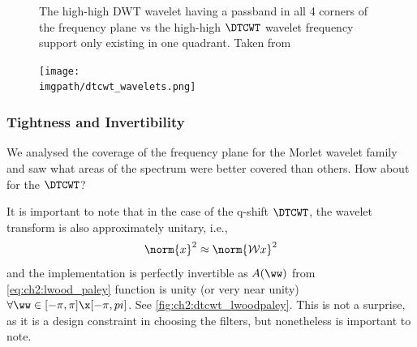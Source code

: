   \begin{figure}
      \newline
              { The high-high DWT wavelet having a passband in
              all 4 corners of the frequency plane vs  the
              high-high $\DTCWT$ wavelet frequency support only existing in one
              quadrant. Taken from \cite{selesnick_dual-tree_2005}}
      \label{fig:ch2:dwt_dtcwt_hh}
  \end{figure}
  \begin{figure}
    \centering
      \texttt{[image: \\imgpath/dtcwt\_wavelets.png]}
      \label{fig:ch2:dtcwt_wavelets}
  \end{figure}

\subsubsection{Tightness and Invertibility}
  We analysed the coverage of the frequency plane for the Morlet wavelet family
  and saw what areas of the spectrum were better covered than others. How about
  for the $\DTCWT$?

  It is important to note that in the case of the q-shift $\DTCWT$, the wavelet
  transform is also approximately unitary, i.e.,\
  \begin{equation}
    \norm{x}^2 \approx \norm{\mathcal{W}x}^2
  \end{equation}
  and the implementation is perfectly invertible as $A(\ww)$ from
  \eqref{eq:ch2:lwood_paley}
  function is unity (or very near unity) $\forall \ww \in [-\pi, \pi]\x [-\pi,
  pi]$. See
  \autoref{fig:ch2:dtcwt_lwoodpaley}. This is not a surprise, as it is a design
  constraint in choosing the filters, but nonetheless is important to note. 

